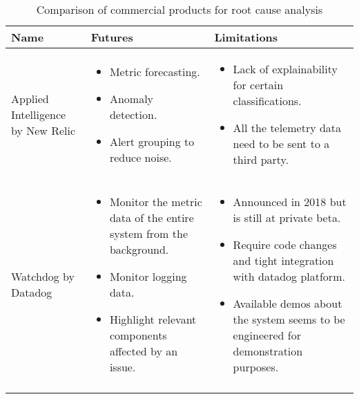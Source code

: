 \begin{longtable}{| p{40mm} | p{55mm} | p{55mm} |}
\hline
  \textbf{Name} &
  \textbf{Futures} &
  \textbf{Limitations} \\ \hline
  Applied Intelligence by New Relic &
  \vspace{-8mm}
  \begin{itemize}[leftmargin=*,noitemsep,nolistsep] 
    \item Metric forecasting.
    \item Anomaly detection.
    \item Alert grouping to reduce noise.
  \vspace{-7mm}
  \end{itemize} &
  \vspace{-8mm}
  \begin{itemize}[leftmargin=*,noitemsep,nolistsep] 
    \item Lack of explainability for certain classifications.
    \item All the telemetry data need to be sent to a third party.
  \vspace{-7mm}
  \end{itemize} \\ \hline
  Watchdog by Datadog &
  \vspace{-8mm}
  \begin{itemize}[leftmargin=*,noitemsep,nolistsep] 
    \item Monitor the metric data of the entire system from the background.
    \item Monitor logging data.
    \item Highlight relevant components affected by an issue.
  \vspace{-7mm}
  \end{itemize} &
  \vspace{-8mm}
  \begin{itemize}[leftmargin=*,noitemsep,nolistsep] 
    \item Announced in 2018 but is still at private beta.
    \item Require code changes and tight integration with datadog platform.
    \item Available demos about the system seems to be engineered for demonstration purposes.
  \vspace{-7mm}
  \end{itemize} \\ \hline
  \caption{Comparison of commercial products for root cause analysis}
\end{longtable}

